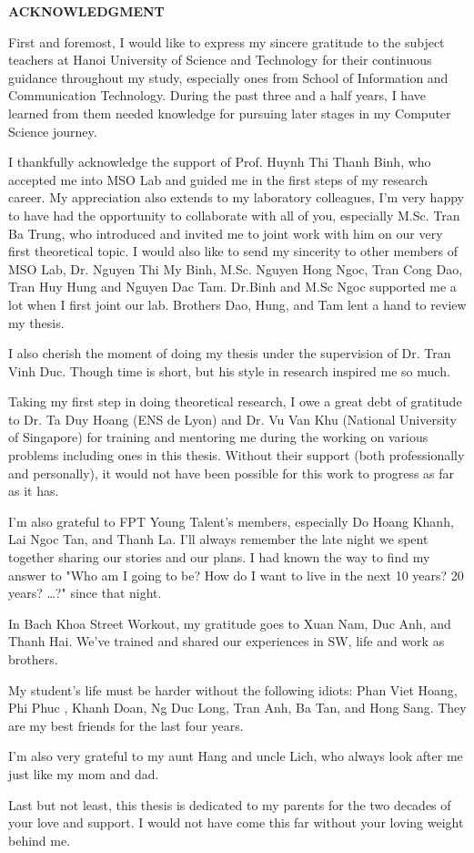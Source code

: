 
\begin{center}
    \Large{\textbf{ACKNOWLEDGMENT}}\\
\end{center}
\vspace{1cm}

First and foremost, I would like to express my sincere gratitude to the subject teachers at Hanoi University of Science and Technology for their continuous guidance throughout my study, especially ones from School of Information and Communication Technology. During the past three and a half years, I have learned from them needed knowledge for pursuing later stages in my Computer Science journey.

I thankfully acknowledge the support of Prof. Huynh Thi Thanh Binh, who accepted me into MSO Lab and guided me in the first steps of my research career. My appreciation also extends to my laboratory colleagues, I'm very happy to have had the opportunity to collaborate with all of you, especially M.Sc. Tran Ba Trung, who introduced and invited me to joint work with him on our very first theoretical topic. I would also like to send my sincerity to other members of MSO Lab, Dr. Nguyen Thi My Binh, M.Sc. Nguyen Hong Ngoc, Tran Cong Dao, Tran Huy Hung and Nguyen Dac Tam. Dr.Binh and M.Sc Ngoc supported me a lot when I first joint our lab. Brothers Dao, Hung, and Tam lent a hand to review my thesis. 

I also cherish the moment of doing my thesis under the supervision of Dr. Tran Vinh Duc. Though time is short, but his style in research inspired me so much. 

Taking my first step in doing theoretical research, I owe a great debt of gratitude to Dr. Ta Duy Hoang (ENS de Lyon) and Dr. Vu Van Khu (National University of Singapore) for training and mentoring me during the working on various problems including ones in this thesis. Without their support (both professionally and personally), it would not have been possible for this work to progress as far as it has. 

I'm also grateful to FPT Young Talent's members, especially Do Hoang Khanh, Lai Ngoc Tan, and Thanh La. I'll always remember the late night we spent together sharing our stories and our plans. I had known the way to find my answer to "Who am I going to be? How do I want to live in the next 10 years? 20 years? \dots?" since that night.

In Bach Khoa Street Workout, my gratitude goes to Xuan Nam, Duc Anh, and Thanh Hai. We've trained and shared our experiences in SW, life and  work as brothers. 

My student's life must be harder without the following idiots: Phan Viet Hoang, Phi Phuc , Khanh Doan, Ng Duc Long, Tran Anh, Ba Tan, and Hong Sang. They are my best friends for the last four years.

I'm also very grateful to my aunt Hang and uncle Lich, who always look after me just like my mom and dad. 

Last but not least, this thesis is dedicated to my parents for the two decades of your love and support. I would not have come this far without your loving weight behind me.
